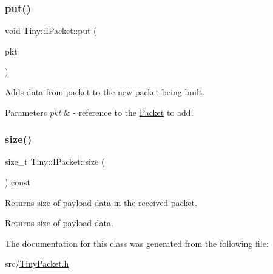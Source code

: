 \subsubsection{\texorpdfstring{put()}{put()}\hspace{0.1cm}{\footnotesize\ttfamily [7/7]}}
{\footnotesize\ttfamily void Tiny\+::\+I\+Packet\+::put (\begin{DoxyParamCaption}\item[{const \hyperlink{classTiny_1_1IPacket}{I\+Packet} \&}]{pkt }\end{DoxyParamCaption})\hspace{0.3cm}{\ttfamily [inline]}}

Adds data from packet to the new packet being built. 
\begin{DoxyParams}{Parameters}
{\em pkt} & -\/ reference to the \hyperlink{classTiny_1_1Packet}{Packet} to add. \\
\hline
\end{DoxyParams}
\mbox{\label{classTiny_1_1IPacket_a76b6389f0d47b67c8428c58c2b09df51}} 
\subsubsection{\texorpdfstring{size()}{size()}}
{\footnotesize\ttfamily size\+\_\+t Tiny\+::\+I\+Packet\+::size (\begin{DoxyParamCaption}{ }\end{DoxyParamCaption}) const\hspace{0.3cm}{\ttfamily [inline]}}

Returns size of payload data in the received packet. \begin{DoxyReturn}{Returns}
size of payload data. 
\end{DoxyReturn}


The documentation for this class was generated from the following file\+:\begin{DoxyCompactItemize}
\item 
src/\hyperlink{TinyPacket_8h}{Tiny\+Packet.\+h}\end{DoxyCompactItemize}
